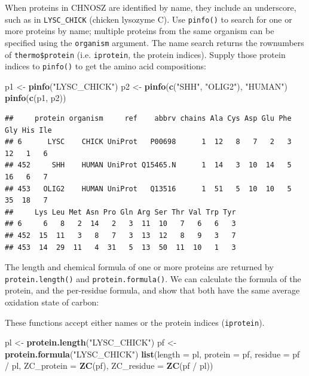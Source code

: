 \documentclass[]{tufte-book}
\newenvironment{Shaded}{}{}
\newcommand{\KeywordTok}[1]{\textcolor[rgb]{0.00,0.44,0.13}{\textbf{#1}}}
\newcommand{\DataTypeTok}[1]{\textcolor[rgb]{0.56,0.13,0.00}{#1}}
\newcommand{\StringTok}[1]{\textcolor[rgb]{0.25,0.44,0.63}{#1}}
\newcommand{\OperatorTok}[1]{\textcolor[rgb]{0.40,0.40,0.40}{#1}}
\newcommand{\NormalTok}[1]{#1}
\begin{document}
When proteins in CHNOSZ are identified by name, they include an
underscore, such as in \texttt{LYSC\_CHICK} (chicken lysozyme C). Use
{\texttt{pinfo()}} to search for one or more proteins by name; multiple
proteins from the same organism can be specified using the
\texttt{organism} argument. The name search returns the rownumbers of
\texttt{thermo\$protein} (i.e. \texttt{iprotein}, the protein indices).
Supply those protein indices to {\texttt{pinfo()}} to get the amino acid
compositions:

\begin{Shaded}
\begin{Highlighting}[]
\NormalTok{p1 <-}\StringTok{ }\KeywordTok{pinfo}\NormalTok{(}\StringTok{"LYSC_CHICK"}\NormalTok{)}
\NormalTok{p2 <-}\StringTok{ }\KeywordTok{pinfo}\NormalTok{(}\KeywordTok{c}\NormalTok{(}\StringTok{"SHH"}\NormalTok{, }\StringTok{"OLIG2"}\NormalTok{), }\StringTok{"HUMAN"}\NormalTok{)}
\KeywordTok{pinfo}\NormalTok{(}\KeywordTok{c}\NormalTok{(p1, p2))}
\end{Highlighting}
\end{Shaded}

\begin{verbatim}
##     protein organism     ref    abbrv chains Ala Cys Asp Glu Phe Gly His Ile
## 6      LYSC    CHICK UniProt   P00698      1  12   8   7   2   3  12   1   6
## 452     SHH    HUMAN UniProt Q15465.N      1  14   3  10  14   5  16   6   7
## 453   OLIG2    HUMAN UniProt   Q13516      1  51   5  10  10   5  35  18   7
##     Lys Leu Met Asn Pro Gln Arg Ser Thr Val Trp Tyr
## 6     6   8   2  14   2   3  11  10   7   6   6   3
## 452  15  11   3   8   7   3  13  12   8   9   3   7
## 453  14  29  11   4  31   5  13  50  11  10   1   3
\end{verbatim}

The length and chemical formula of one or more proteins are returned by
{\texttt{protein.length()}} and {\texttt{protein.formula()}}. We can
calculate the formula of the protein, and the per-residue formula, and
show that both have the same average oxidation state of carbon:

\begin{marginfigure}
These functions accept either names or the protein indices
(\texttt{iprotein}).
\end{marginfigure}

\begin{Shaded}
\begin{Highlighting}[]
\NormalTok{pl <-}\StringTok{ }\KeywordTok{protein.length}\NormalTok{(}\StringTok{"LYSC_CHICK"}\NormalTok{)}
\NormalTok{pf <-}\StringTok{ }\KeywordTok{protein.formula}\NormalTok{(}\StringTok{"LYSC_CHICK"}\NormalTok{)}
\KeywordTok{list}\NormalTok{(}\DataTypeTok{length =}\NormalTok{ pl, }\DataTypeTok{protein =}\NormalTok{ pf, }\DataTypeTok{residue =}\NormalTok{ pf }\OperatorTok{/}\StringTok{ }\NormalTok{pl,}
     \DataTypeTok{ZC_protein =} \KeywordTok{ZC}\NormalTok{(pf), }\DataTypeTok{ZC_residue =} \KeywordTok{ZC}\NormalTok{(pf }\OperatorTok{/}\StringTok{ }\NormalTok{pl))}
\end{Highlighting}
\end{Shaded}
\end{document}
